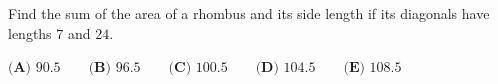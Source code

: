 Find the sum of the area of a rhombus and its side length if its diagonals have lengths $7$ and $24$.

$\textbf{(A) }90.5\qquad\textbf{(B) }96.5\qquad\textbf{(C) }100.5\qquad\textbf{(D) }104.5\qquad\textbf{(E) }108.5$
